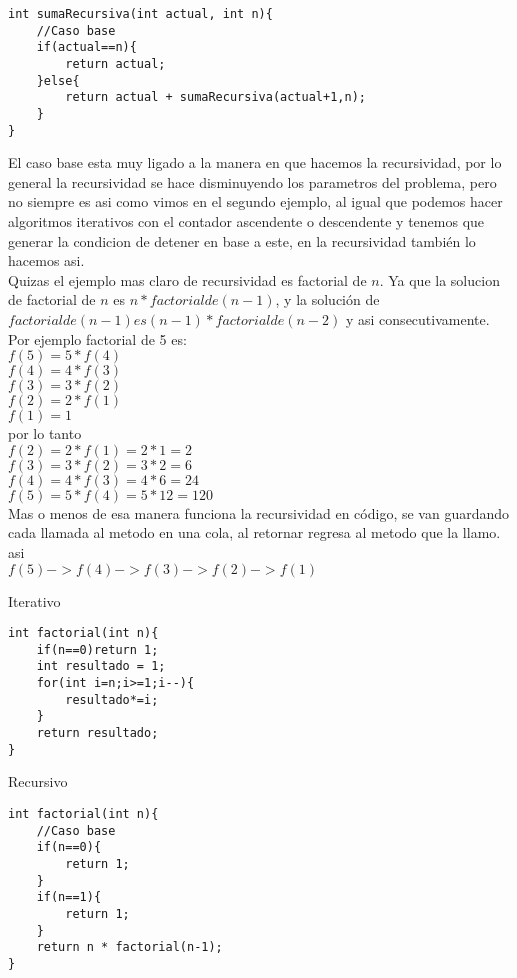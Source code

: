 \begin{minipage}{\textwidth}
\begin{lstlisting}[style=C,caption=sumaRecursiva2.cpp]
int sumaRecursiva(int actual, int n){
    //Caso base
    if(actual==n){
        return actual;
    }else{
        return actual + sumaRecursiva(actual+1,n);
    }
}
\end{lstlisting}
\end{minipage}
El caso base esta muy ligado a la manera en que hacemos la recursividad, por lo general la
recursividad se hace disminuyendo los parametros del problema, pero no siempre es asi como
vimos en el segundo ejemplo, al igual que podemos hacer algoritmos iterativos con el contador
ascendente o descendente y tenemos que generar la condicion de detener en base a este, en la
recursividad también lo hacemos asi.
\\Quizas el ejemplo mas claro de recursividad es factorial de $n$. Ya que la solucion de factorial
de $n$ es $n * factorial de (n-1)$, y la solución de $factorial de (n-1) es (n-1) * factorial de (n-2)$ y asi consecutivamente. Por ejemplo factorial de 5 es:
\\$f(5) = 5*f(4)$
\\$f(4) = 4*f(3)$
\\$f(3) = 3*f(2)$
\\$f(2) = 2*f(1)$
\\$f(1) = 1$
\\por lo tanto
\\$f(2) = 2*f(1) = 2*1 = 2$
\\$f(3) = 3*f(2) = 3*2 = 6$
\\$f(4) = 4*f(3) = 4*6 = 24$
\\$f(5) = 5*f(4) = 5*12 = 120$
\\Mas o menos de esa manera funciona la recursividad en código, se van guardando cada llamada al
metodo en una cola, al retornar regresa al metodo que la llamo. asi
\\$f(5)->f(4)->f(3)->f(2)->f(1)$
\\\begin{minipage}{\textwidth}
Iterativo
\begin{lstlisting}[style=C,caption=factorialIterativo.cpp]
int factorial(int n){
    if(n==0)return 1;
    int resultado = 1;
    for(int i=n;i>=1;i--){
        resultado*=i;
    }
    return resultado;
}
\end{lstlisting}
\end{minipage}

\begin{minipage}{\textwidth}
Recursivo
\begin{lstlisting}[style=C,caption=factorialRecursivo.cpp]
int factorial(int n){
    //Caso base
    if(n==0){
        return 1;
    }
    if(n==1){
        return 1;
    }
    return n * factorial(n-1);
}
\end{lstlisting}
\end{minipage}

